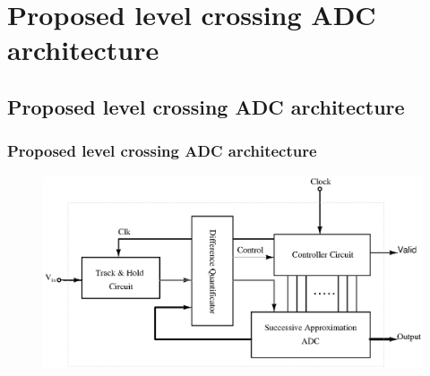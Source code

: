 \documentclass{beamer}
\begin{document}
\section{Proposed level crossing ADC architecture}
\subsection*{Proposed level crossing ADC architecture}
\begin{frame}
	\frametitle{Proposed level crossing ADC architecture}  \footnotesize
	\begin{center}
		\begin{figure}
			\includegraphics[width=10 cm,height=5 cm,angle=360]{Figures/09ADCpro.ps}\\
		\end{figure}
		\scriptsize{ \color{blue}{Block diagram of the proposed level crossing ADC architecture}}
	\end{center}
\end{frame}
\end{document}
